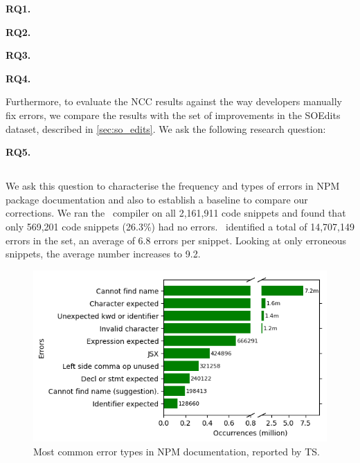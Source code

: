 \documentclass[conference]{IEEEtran}
\begin{document}
\begin{adjustwidth}{0.5em}{0.5em}
\vspace{1ex}
\noindent
\textbf{RQ1.} \rqone

\noindent
\textbf{RQ2.} \rqtwo

\noindent
\textbf{RQ3.} \rqthree

\noindent
\textbf{RQ4.} \rqfour
\vspace{1ex}
\end{adjustwidth}
\noindent

Furthermore, to evaluate the NCC results against the way developers manually fix errors, we compare the results with the set of improvements in the SOEdits dataset, described in \autoref{sec:so_edits}. We ask the following research question:

\begin{adjustwidth}{0.5em}{0.5em}
\vspace{1ex}
\noindent
\textbf{RQ5.} \rqfive
\vspace{1ex}
\end{adjustwidth}
\noindent

\subsection{\rqone}
\label{sec:rq1}

We ask this question to characterise the frequency and types of errors in NPM package documentation and also to establish a baseline to compare our corrections. We ran the \ts\ compiler on all 2,161,911 code snippets and found that only 569,201 code snippets (26.3\%) had no errors. \ts\ identified a total of 14,707,149 errors in the set, an average of 6.8 errors per snippet. Looking at only erroneous snippets, the average number increases to 9.2.

\begin{figure}[t]
    \centering
    \includegraphics[width=0.8\linewidth]{images/commonErrorTypes.png}
    \caption{Most common error types in NPM documentation, reported by TS.}
    \label{fig:common_err}
\end{figure}
\end{document}
